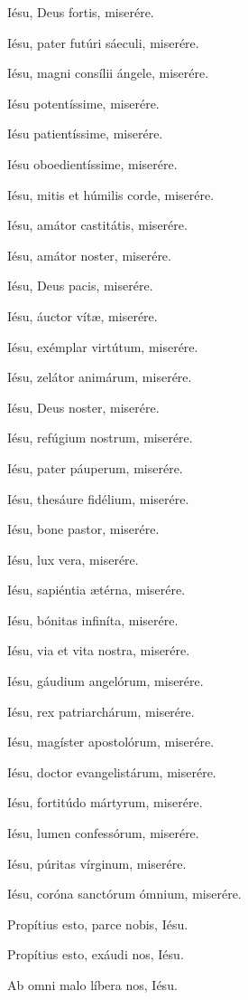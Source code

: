 \documentclass[12pt,a6paper]{book}
\begin{document}
\begin{sloppy}
Iésu, Deus fortis, miserére.

Iésu, pater futúri sáeculi, miserére.

Iésu, magni consílii ángele, miserére.

Iésu potentíssime, miserére.

Iésu patientíssime, miserére.

Iésu oboedientíssime, miserére.

Iésu, mitis et húmilis corde, miserére.

Iésu, amátor castitátis, miserére.

Iésu, amátor noster, miserére.

Iésu, Deus pacis, miserére.

Iésu, áuctor vítæ, miserére.

Iésu, exémplar virtútum, miserére.

Iésu, zelátor animárum, miserére.

Iésu, Deus noster, miserére.

Iésu, refúgium nostrum, miserére.

Iésu, pater páuperum, miserére.

Iésu, thesáure fidélium, miserére.

Iésu, bone pastor, miserére.

Iésu, lux vera, miserére.

Iésu, sapiéntia ætérna, miserére.

Iésu, bónitas infiníta, miserére.

Iésu, via et vita nostra, miserére.

Iésu, gáudium angelórum, miserére.

Iésu, rex patriarchárum, miserére.

Iésu, magíster apostolórum, miserére.

Iésu, doctor evangelistárum, miserére.

Iésu, fortitúdo mártyrum, miserére.

Iésu, lumen confessórum, miserére.

Iésu, púritas vírginum, miserére.

Iésu, coróna sanctórum ómnium, miserére.

\vspace{3mm}

Propítius esto, parce nobis, Iésu.

Propítius esto, exáudi nos, Iésu.

\vspace{3mm}

Ab omni malo líbera nos, Iésu.


\end{sloppy}
\end{document}
